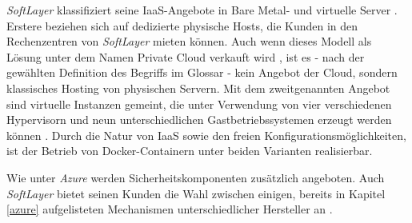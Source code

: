\documentclass[../main.tex]{subfiles}
\begin{document}
      \emph{SoftLayer} klassifiziert seine IaaS-Angebote in \glqq{}Bare Metal\grqq{}- und virtuelle Server . Erstere beziehen sich auf dedizierte physische Hosts, die Kunden in den Rechenzentren von \emph{SoftLayer} mieten können. Auch wenn dieses Modell als Lösung unter dem Namen \glqq{}Private Cloud\grqq{} verkauft wird \cite{softlayerPrivateCloud}, ist es - nach der gewählten Definition des Begriffs im Glossar - kein Angebot der Cloud, sondern klassisches Hosting von physischen Servern.
      Mit dem zweitgenannten Angebot sind virtuelle Instanzen gemeint, die unter Verwendung von vier verschiedenen Hypervisorn und neun unterschiedlichen Gastbetriebssystemen erzeugt werden können \cite{softlayerSoftware}. Durch die Natur von IaaS sowie den freien Konfigurationsmöglichkeiten, ist der Betrieb von Docker-Containern unter beiden Varianten realisierbar.

      Wie unter \emph{Azure} werden Sicherheitskomponenten zusätzlich angeboten. Auch \emph{SoftLayer} bietet seinen Kunden die Wahl zwischen einigen, bereits in Kapitel \ref{azure} aufgelisteten Mechanismen unterschiedlicher Hersteller an \cite{softlayerSoftwareSec}.



\end{document}
